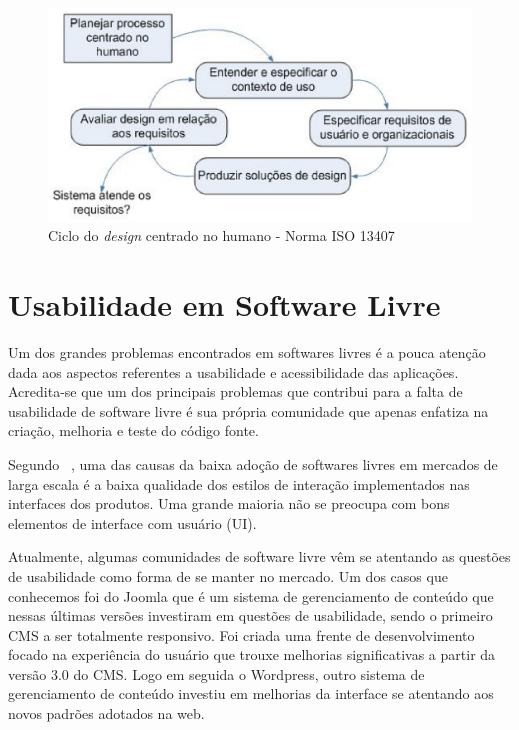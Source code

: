 \begin{figure}[h]
    \centering
    \includegraphics[keepaspectratio=true,scale=0.60]
      {figuras/ciclo_iso13407.eps}
    \caption{Ciclo do \emph{design} centrado no humano - Norma ISO 13407}
    \label{ciclo_iso13407}
\end{figure}


\section{Usabilidade em Software Livre}

	Um dos grandes problemas encontrados em softwares livres é a pouca atenção dada aos aspectos referentes a usabilidade e acessibilidade das aplicações. Acredita-se que um dos principais problemas que contribui para a falta de usabilidade de software livre é sua própria comunidade que apenas enfatiza na criação, melhoria e teste do código fonte.  

Segundo ~, uma das causas da baixa adoção de softwares livres em mercados de larga escala é a baixa qualidade dos estilos de interação implementados nas interfaces dos produtos. Uma grande maioria não se preocupa com bons elementos de interface com usuário (UI). 

Atualmente, algumas comunidades de software livre vêm se atentando as questões de usabilidade como forma de se manter no mercado. Um dos casos que conhecemos foi do Joomla que é um sistema de gerenciamento de conteúdo  que nessas últimas versões investiram em questões de usabilidade, sendo o primeiro CMS a ser totalmente responsivo. Foi criada uma frente de desenvolvimento focado na experiência do usuário que trouxe melhorias significativas a partir da versão 3.0 do CMS. Logo em seguida o Wordpress, outro sistema de gerenciamento de conteúdo investiu em melhorias da interface se atentando aos novos padrões adotados na web.

